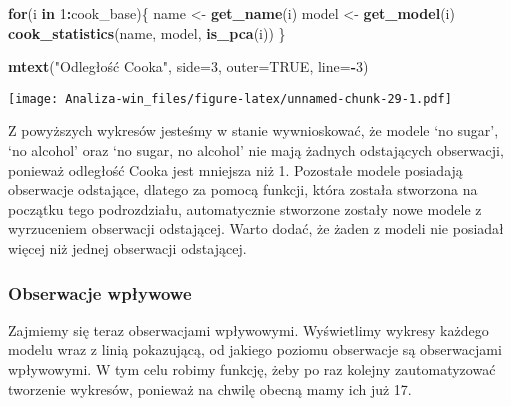 \documentclass[
]{article}
\newenvironment{Shaded}{\begin{snugshade}}{\end{snugshade}}
\newcommand{\AttributeTok}[1]{\textcolor[rgb]{0.13,0.29,0.53}{#1}}
\newcommand{\ConstantTok}[1]{\textcolor[rgb]{0.56,0.35,0.01}{#1}}
\newcommand{\ControlFlowTok}[1]{\textcolor[rgb]{0.13,0.29,0.53}{\textbf{#1}}}
\newcommand{\DecValTok}[1]{\textcolor[rgb]{0.00,0.00,0.81}{#1}}
\newcommand{\FunctionTok}[1]{\textcolor[rgb]{0.13,0.29,0.53}{\textbf{#1}}}
\newcommand{\NormalTok}[1]{#1}
\newcommand{\OtherTok}[1]{\textcolor[rgb]{0.56,0.35,0.01}{#1}}
\newcommand{\SpecialCharTok}[1]{\textcolor[rgb]{0.81,0.36,0.00}{\textbf{#1}}}
\newcommand{\StringTok}[1]{\textcolor[rgb]{0.31,0.60,0.02}{#1}}
\begin{document}
\begin{Shaded}
\begin{Highlighting}[]
\ControlFlowTok{for}\NormalTok{(i }\ControlFlowTok{in} \DecValTok{1}\SpecialCharTok{:}\NormalTok{cook\_base)\{}
\NormalTok{  name  }\OtherTok{\textless{}{-}} \FunctionTok{get\_name}\NormalTok{(i)}
\NormalTok{  model }\OtherTok{\textless{}{-}} \FunctionTok{get\_model}\NormalTok{(i)}
  \FunctionTok{cook\_statistics}\NormalTok{(name, model, }\FunctionTok{is\_pca}\NormalTok{(i))}
\NormalTok{\}}

\FunctionTok{mtext}\NormalTok{(}\StringTok{"Odległość Cooka"}\NormalTok{, }\AttributeTok{side=}\DecValTok{3}\NormalTok{, }\AttributeTok{outer=}\ConstantTok{TRUE}\NormalTok{, }\AttributeTok{line=}\SpecialCharTok{{-}}\DecValTok{3}\NormalTok{)}
\end{Highlighting}
\end{Shaded}

\texttt{[image: Analiza-win\_files/figure-latex/unnamed-chunk-29-1.pdf]}

Z powyższych wykresów jesteśmy w stanie wywnioskować, że modele `no
sugar', `no alcohol' oraz `no sugar, no alcohol' nie mają żadnych
odstających obserwacji, ponieważ odległość Cooka jest mniejsza niż 1.
Pozostałe modele posiadają obserwacje odstające, dlatego za pomocą
funkcji, która została stworzona na początku tego podrozdziału,
automatycznie stworzone zostały nowe modele z wyrzuceniem obserwacji
odstającej. Warto dodać, że żaden z modeli nie posiadał więcej niż
jednej obserwacji odstającej.

\subsubsection{Obserwacje wpływowe}\label{obserwacje-wpux142ywowe}

Zajmiemy się teraz obserwacjami wpływowymi. Wyświetlimy wykresy każdego
modelu wraz z linią pokazującą, od jakiego poziomu obserwacje są
obserwacjami wpływowymi. W tym celu robimy funkcję, żeby po raz kolejny
zautomatyzować tworzenie wykresów, ponieważ na chwilę obecną mamy ich
już 17.
\end{document}
